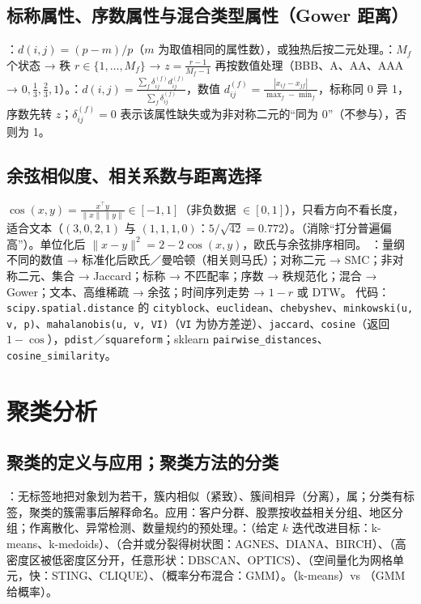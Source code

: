 \subsection{标称属性、序数属性与混合类型属性（Gower 距离）}
：$d(i,j)=(p-m)/p$（$m$ 为取值相同的属性数），或独热后按二元处理。：$M_f$ 个状态 → 秩 $r\in\{1,\dots,M_f\}$ → $z=\frac{r-1}{M_f-1}$ 再按数值处理（BBB、A、AA、AAA → $0,\frac13,\frac23,1$）。：$d(i,j)=\frac{\sum_f\delta_{ij}^{(f)}d_{ij}^{(f)}}{\sum_f\delta_{ij}^{(f)}}$，数值 $d_{ij}^{(f)}=\frac{|x_{if}-x_{jf}|}{\max_f-\min_f}$，标称同 0 异 1，序数先转 $z$；$\delta_{ij}^{(f)}=0$ 表示该属性缺失或为非对称二元的“同为 0”（不参与），否则为 1。

\subsection{余弦相似度、相关系数与距离选择}
 $\cos(x,y)=\frac{x^\top y}{\|x\|\,\|y\|}\in[-1,1]$（非负数据 $\in[0,1]$），只看方向不看长度，适合文本（$(3,0,2,1)$ 与 $(1,1,1,0)$：$5/\sqrt{42}=0.772$）。（消除“打分普遍偏高”）。单位化后 $\|x-y\|^2=2-2\cos(x,y)$，欧氏与余弦排序相同。
：量纲不同的数值 → 标准化后欧氏／曼哈顿（相关则马氏）；对称二元 → SMC；非对称二元、集合 → Jaccard；标称 → 不匹配率；序数 → 秩规范化；混合 → Gower；文本、高维稀疏 → 余弦；时间序列走势 → $1-r$ 或 DTW。
代码：\texttt{scipy.spatial.distance} 的 \texttt{cityblock}、\texttt{euclidean}、\texttt{chebyshev}、\texttt{minkowski(u, v, p)}、\texttt{mahalanobis(u, v, VI)}（\texttt{VI} 为协方差逆）、\texttt{jaccard}、\texttt{cosine}（返回 $1-\cos$），\texttt{pdist}／\texttt{squareform}；sklearn \texttt{pairwise\_distances}、\texttt{cosine\_similarity}。

\section{聚类分析}

\subsection{聚类的定义与应用；聚类方法的分类}
：无标签地把对象划为若干，簇内相似（紧致）、簇间相异（分离），属；分类有标签，聚类的簇需事后解释命名。应用：客户分群、股票按收益相关分组、地区分组；作离散化、异常检测、数量规约的预处理。：（给定 $k$ 迭代改进目标：k-means、k-medoids）、（合并或分裂得树状图：AGNES、DIANA、BIRCH）、（高密度区被低密度区分开，任意形状：DBSCAN、OPTICS）、（空间量化为网格单元，快：STING、CLIQUE）、（概率分布混合：GMM）。（k-means）vs （GMM 给概率）。

